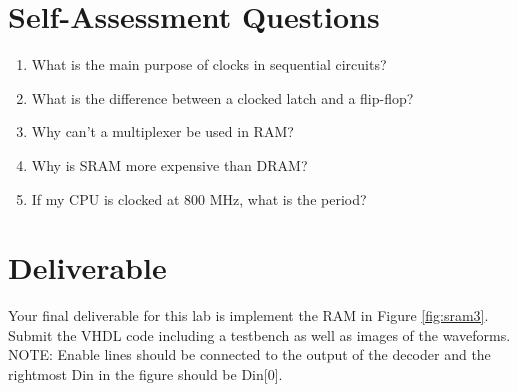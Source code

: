 \documentclass[a4paper, 11pt,oneside]{article}
\begin{document}
\section{Self-Assessment Questions}
\begin{enumerate}
\item What is the main purpose of clocks in sequential circuits?
\item What is the difference between a clocked latch and a flip-flop?
\item Why can't a multiplexer be used in RAM?
\item Why is SRAM more expensive than DRAM?
\item If my CPU is clocked at 800 MHz, what is the period?
\end{enumerate}


\section{Deliverable}
Your final deliverable for this lab is implement the RAM in Figure 
 \ref{fig:sram3}. Submit the VHDL code including a testbench as well as images 
of the waveforms. NOTE: Enable lines should be connected to the output of the 
decoder and the rightmost Din in the figure should be Din[0].





\nocite{*}
\end{document}
